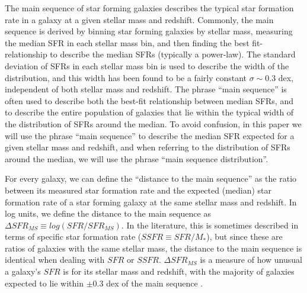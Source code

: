 \documentclass[a4paper,fleqn,usenatbib]{mnras}
\begin{document}
The main sequence of star forming galaxies describes the typical star formation rate in a galaxy at a given stellar mass and redshift. Commonly, the main sequence is derived by binning star forming galaxies by stellar mass, measuring the median SFR in each stellar mass bin, and then finding the best fit-relationship to describe the median SFRs (typically a power-law). The standard deviation of SFRs in each stellar mass bin is used to describe the width of the distribution, and this width has been found to be a fairly constant $\sigma \sim 0.3$ dex, independent of both stellar mass and redshift. The phrase ``main sequence'' is often used to describe both the best-fit relationship between median SFRs, and to describe the entire population of galaxies that lie within the typical width of the distribution of SFRs around the median. To avoid confusion, in this paper we will use the phrase ``main sequence'' to describe the median SFR expected for a given stellar mass and redshift, and when referring to the distribution of SFRs around the median, we will use the phrase ``main sequence distribution''. 

For every galaxy, we can define the ``distance to the main sequence'' as the ratio between its measured star formation rate and the expected (median) star formation rate of a star forming galaxy at the same stellar mass and redshift. In log units, we define the distance to the main sequence as $\Delta SFR_{MS} \equiv log(SFR/SFR_{MS})$. In the literature, this is sometimes described in terms of specific star formation rate ($SSFR \equiv SFR/M_{*}$), but since these are ratios of galaxies with the same stellar mass, the distance to the main sequence is identical when dealing with $SFR$ or $SSFR$. $\Delta SFR_{MS} $ is a measure of how unusual a galaxy's $SFR$ is for its stellar mass and redshift, with the majority of galaxies expected to lie within $\pm 0.3$ dex of the main sequence \citep{2007ApJ...660L..43N}.
\end{document}
